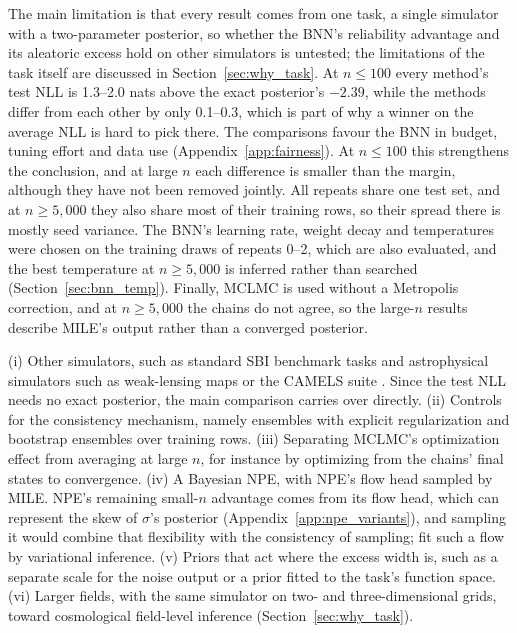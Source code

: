 \documentclass[11pt]{article}
\begin{document}
\label{sec:disc_limits}
The main limitation is that every result comes from one task, a single simulator with a two-parameter posterior, so
whether the BNN's reliability advantage and its aleatoric excess hold on other simulators is untested; the limitations
of the task itself are discussed in Section~\ref{sec:why_task}. At $n\le100$ every method's test NLL is 1.3--2.0 nats
above the exact posterior's $-2.39$, while the methods differ from each other by only 0.1--0.3, which is part of why a
winner on the average NLL is hard to pick there. The comparisons favour the BNN in budget, tuning effort and data use
(Appendix~\ref{app:fairness}). At $n\le100$ this strengthens the conclusion, and at large $n$ each difference is smaller
than the margin, although they have not been removed jointly. All repeats share one test set, and at $n\ge5{,}000$ they
also share most of their training rows, so their spread there is mostly seed variance. The BNN's learning rate, weight
decay and temperatures were chosen on the training draws of repeats 0--2, which are also evaluated, and the best
temperature at $n\ge5{,}000$ is inferred rather than searched (Section~\ref{sec:bnn_temp}). Finally, MCLMC is used without
a Metropolis correction, and at $n\ge5{,}000$ the chains do not agree, so the large-$n$ results describe MILE's output
rather than a converged posterior.

\label{sec:disc_head}
(i) Other simulators, such as standard SBI benchmark tasks \citep{lueckmann2021benchmark} and astrophysical simulators
such as weak-lensing maps \citep{jeffrey2021lensing} or the CAMELS suite \citep{villaescusa2021camels}. Since the test
NLL needs no exact posterior, the main comparison carries over directly. (ii) Controls for the consistency mechanism,
namely ensembles with explicit regularization and bootstrap ensembles over training rows. (iii) Separating MCLMC's
optimization effect from averaging at large $n$, for instance by optimizing from the chains' final states to
convergence. (iv) A Bayesian NPE, with NPE's flow head sampled by MILE. NPE's remaining small-$n$ advantage comes from
its flow head, which can represent the skew of $\sigma$'s posterior (Appendix~\ref{app:npe_variants}), and sampling it
would combine that flexibility with the consistency of sampling; \citet{delaunoy2024lowbudget} fit such a flow by
variational inference. (v) Priors that act where the excess width is, such as a separate scale for the noise output or
a prior fitted to the task's function space. (vi) Larger fields, with the same simulator on two- and three-dimensional
grids, toward cosmological field-level inference (Section~\ref{sec:why_task}).
\end{document}
